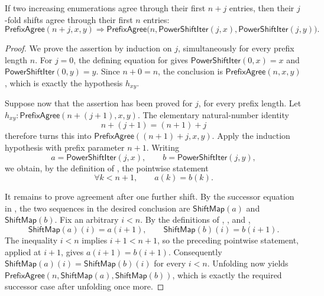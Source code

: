 \begin{lemma}
If two increasing enumerations agree through their first $n+j$ entries, then
their $j$-fold shifts agree through their first $n$ entries:
\[
\mathsf{PrefixAgree}(n+j,x,y)
\Longrightarrow
\mathsf{PrefixAgree}\bigl(n,\mathsf{PowerShiftIter}(j,x),
  \mathsf{PowerShiftIter}(j,y)\bigr).
\]
\end{lemma}
\begin{proof}
We prove the assertion by induction on $j$, simultaneously for every
prefix length $n$.  For $j=0$, the defining equation for
 gives
\(\mathsf{PowerShiftIter}(0,x)=x\) and
\(\mathsf{PowerShiftIter}(0,y)=y\).  Since $n+0=n$, the conclusion is
\(\mathsf{PrefixAgree}(n,x,y)\), which is exactly the hypothesis
\(h_{xy}\).

Suppose now that the assertion has been proved for $j$, for every prefix
length.  Let
\(h_{xy}:\mathsf{PrefixAgree}(n+(j+1),x,y)\).  The elementary natural-number
identity
\[
n+(j+1)=(n+1)+j
\]
therefore turns this into
\(\mathsf{PrefixAgree}((n+1)+j,x,y)\).  Apply the induction hypothesis
with prefix parameter $n+1$.  Writing
\[
a=\mathsf{PowerShiftIter}(j,x),\qquad
b=\mathsf{PowerShiftIter}(j,y),
\]
we obtain, by the definition of , the pointwise
statement
\[
\forall k<n+1,\qquad a(k)=b(k).
\]

It remains to prove agreement after one further shift.  By the successor
equation in , the two sequences in the desired
conclusion are \(\mathsf{ShiftMap}(a)\) and \(\mathsf{ShiftMap}(b)\).
Fix an arbitrary \(i<n\).  By the definitions of ,
, and ,
\[
\mathsf{ShiftMap}(a)(i)=a(i+1),\qquad
\mathsf{ShiftMap}(b)(i)=b(i+1).
\]
The inequality \(i<n\) implies \(i+1<n+1\), so the preceding pointwise
statement, applied at $i+1$, gives \(a(i+1)=b(i+1)\).  Consequently
\(\mathsf{ShiftMap}(a)(i)=\mathsf{ShiftMap}(b)(i)\) for every $i<n$.
Unfolding  now yields
\(\mathsf{PrefixAgree}(n,\mathsf{ShiftMap}(a),\mathsf{ShiftMap}(b))\),
which is exactly the required successor case after unfolding
 once more.
\end{proof}
